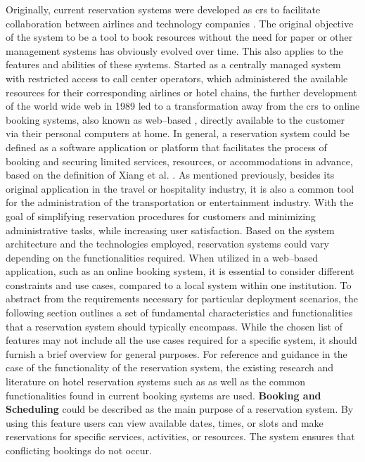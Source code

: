 Originally, current reservation systems were developed as \acrfull{crs} to facilitate collaboration between airlines and technology companies \cite{xiang_evolution_2020}. The original objective of the system to be a tool to book resources without the need for paper or other management systems has obviously evolved over time.
This also applies to the features and abilities of these systems.
Started as a centrally managed system with restricted access to call center operators, which administered the available resources for their corresponding airlines or hotel chains, the further development of the world wide web in 1989 led to a transformation away from the \acrshort{crs} to online booking systems, also known as web--based , directly available to the customer via their personal computers at home.
In general, a reservation system could be defined as a software application or platform that facilitates the process of booking and securing limited services, resources, or accommodations in advance, based on the definition of Xiang et al. \cite[p.~2]{xiang_evolution_2020}.
As mentioned previously, besides its original application in the travel or hospitality industry, it is also a common tool for the administration of the transportation or entertainment industry. With the goal of simplifying reservation procedures for customers and minimizing administrative tasks, while increasing user satisfaction.
Based on the system architecture and the technologies employed, reservation systems could vary depending on the functionalities required. When utilized in a web--based application, such as an online booking system, it is essential to consider different constraints and use cases, compared to a local system within one institution.
To abstract from the requirements necessary for particular deployment scenarios, the following section outlines a set of fundamental characteristics and functionalities that a reservation system should typically encompass. While the chosen list of features may not include all the use cases required for a specific system, it should furnish a brief overview for general purposes.
For reference and guidance in the case of the functionality of the reservation system, the existing research and literature on hotel reservation systems such as \cite{bemile_online_nodate,delizo_online_2013} as well as the common functionalities found in current booking systems are used.
\textbf{Booking and Scheduling} could be described as the main purpose of a reservation system. By using this feature users can view available dates, times, or slots and make reservations for specific services, activities, or resources. The system ensures that conflicting bookings do not occur.
